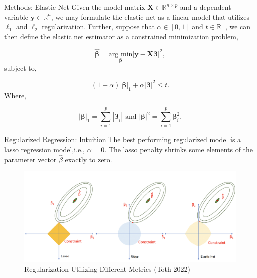 \documentclass[
  11pt,
  ignorenonframetext,
]{beamer}
\begin{document}
\begin{frame}{Methods: Elastic Net}
\protect\hypertarget{methods-elastic-net}{}
Given the model matrix \(\mathbf{X} \in \mathbb{R}^{n\times p}\) and a
dependent variable \(\mathbf{y} \in \mathbb{R}^n\), we may formulate the
elastic net as a linear model that utilizes \(\ell_1\) and \(\ell_2\)
regularization. Further, suppose that \(\alpha \in [0, 1]\) and
\(t \in \mathbb{R}^+\), we can then define the elastic net estimator as
a constrained minimization problem,

\[ 
\boldsymbol{\hat{\beta}} = \underset{\boldsymbol{\beta}}{\text{arg min}} |\mathbf{y} - \mathbf{X}\boldsymbol{\beta}|^2,
\] subject to,

\[
(1 - \alpha)|\boldsymbol{\beta}|_1 + \alpha|\boldsymbol{\beta}|^2 \leq t. 
\] Where,

\[
|\boldsymbol{\beta}|_1 = \sum\limits_{i = 1}^{p}|\boldsymbol{\beta}_i|\text{ and } |\boldsymbol{\beta}|^2 = \sum\limits_{i = 1}^{p}\boldsymbol{\beta}_i^2.
\]
\end{frame}

\begin{frame}{Regularized Regression:
\href{https://www.desmos.com/calculator/59axr4plef}{Intuition}}
\protect\hypertarget{regularized-regression-intuition}{}
The best performing regularized model is a lasso regression model,i.e.,
\(\alpha = 0\). The lasso penalty shrinks some elements of the parameter
vector \(\hat\beta\) exactly to zero.

\begin{figure}

{\centering \includegraphics[width=0.9\linewidth]{./../figures/lasso_ridge} 

}

\caption{Regularization Utilizing Different Metrics (Toth 2022)}\label{fig:unnamed-chunk-3}
\end{figure}
\end{frame}
\end{document}
